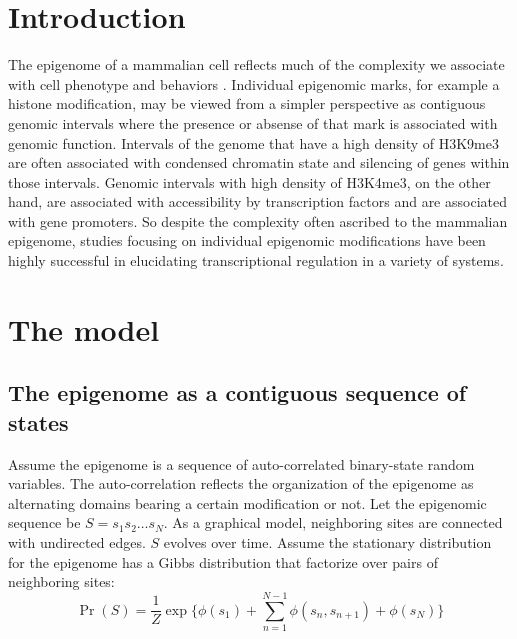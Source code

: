 \documentclass[11pt]{article}
\begin{document}
\section{Introduction}

The epigenome of a mammalian cell reflects much of the complexity we
associate with cell phenotype and behaviors \cite{}. Individual
epigenomic marks, for example a histone modification, may be viewed
from a simpler perspective as contiguous genomic intervals where the
presence or absense of that mark is associated with genomic
function. Intervals of the genome that have a high density of H3K9me3
are often associated with condensed chromatin state and silencing of
genes within those intervals\cite{}. Genomic intervals with high
density of H3K4me3, on the other hand, are associated with
accessibility by transcription factors and are associated with gene
promoters\cite{}. So despite the complexity often ascribed to the
mammalian epigenome\cite{}, studies focusing on individual epigenomic
modifications have been highly successful in elucidating
transcriptional regulation in a variety of systems\cite{}.


\section{The model}

\subsection{The epigenome as a contiguous sequence of states}


Assume the epigenome is a sequence of auto-correlated binary-state
random variables. The auto-correlation reflects the organization of
the epigenome as alternating domains bearing a certain modification or
not. Let the epigenomic sequence be $S=s_1s_2\ldots s_N$.
As a graphical model, neighboring sites are connected with undirected
edges. $S$ evolves over time. Assume the stationary distribution for
the epigenome has a Gibbs distribution that factorize over pairs of
neighboring sites:
\begin{equation}\label{eqn:stationary}
\Pr(S) = \frac{1}{Z} \exp\big\{\phi(s_1) +\sum_{n=1}^{N-1}\phi(s_n, s_{n+1}) + \phi(s_N)\big\}
\end{equation}
\end{document}
